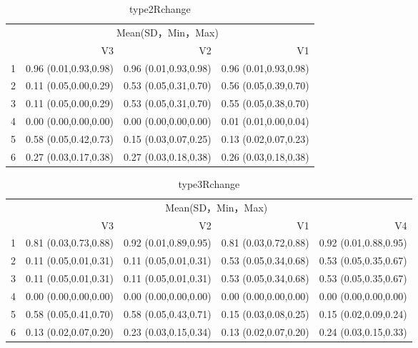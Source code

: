\begin{table}[h]
\centering
\caption{type2Rchange}
\label{tab:type2changeR}
\begin{tabular}{crrr}
\toprule
      & \multicolumn{3}{c}{Mean(SD，Min，Max)} \\
\cmidrule{2-4}      & V3    & V2    & V1 \\
\midrule
1     & 0.96 (0.01,0.93,0.98) & 0.96 (0.01,0.93,0.98) & 0.96 (0.01,0.93,0.98) \\
2     & 0.11 (0.05,0.00,0.29) & 0.53 (0.05,0.31,0.70) & 0.56 (0.05,0.39,0.70) \\
3     & 0.11 (0.05,0.00,0.29) & 0.53 (0.05,0.31,0.70) & 0.55 (0.05,0.38,0.70) \\
4     & 0.00 (0.00,0.00,0.00) & 0.00 (0.00,0.00,0.00) & 0.01 (0.01,0.00,0.04) \\
5     & 0.58 (0.05,0.42,0.73) & 0.15 (0.03,0.07,0.25) & 0.13 (0.02,0.07,0.23) \\
6     & 0.27 (0.03,0.17,0.38) & 0.27 (0.03,0.18,0.38) & 0.26 (0.03,0.18,0.38) \\
\bottomrule
\end{tabular}
\end{table}

\begin{table}[h]
\centering
\caption{type3Rchange}
\label{tab:type3changeR}
\begin{tabular}{crrrr}
\toprule
      & \multicolumn{4}{c}{Mean(SD，Min，Max)} \\
\cmidrule{2-5}      & V3    & V2    & V1    & V4 \\
\midrule
1     & 0.81 (0.03,0.73,0.88) & 0.92 (0.01,0.89,0.95) & 0.81 (0.03,0.72,0.88) & 0.92 (0.01,0.88,0.95) \\
2     & 0.11 (0.05,0.01,0.31) & 0.11 (0.05,0.01,0.31) & 0.53 (0.05,0.34,0.68) & 0.53 (0.05,0.35,0.67) \\
3     & 0.11 (0.05,0.01,0.31) & 0.11 (0.05,0.01,0.31) & 0.53 (0.05,0.34,0.68) & 0.53 (0.05,0.35,0.67) \\
4     & 0.00 (0.00,0.00,0.00) & 0.00 (0.00,0.00,0.00) & 0.00 (0.00,0.00,0.00) & 0.00 (0.00,0.00,0.00) \\
5     & 0.58 (0.05,0.41,0.70) & 0.58 (0.05,0.43,0.71) & 0.15 (0.03,0.08,0.25) & 0.15 (0.02,0.09,0.24) \\
6     & 0.13 (0.02,0.07,0.20) & 0.23 (0.03,0.15,0.34) & 0.13 (0.02,0.07,0.20) & 0.24 (0.03,0.15,0.33) \\
\bottomrule
\end{tabular}
\end{table}

